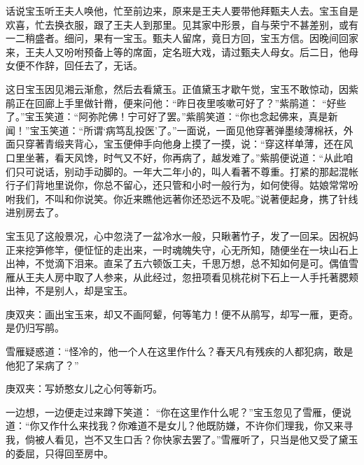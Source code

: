 

\begin{parag}
    话说宝玉听王夫人唤他，忙至前边来，原来是王夫人要带他拜甄夫人去。宝玉自是欢喜，忙去换衣服，跟了王夫人到那里。见其家中形景，自与荣宁不甚差别，或有一二稍盛者。细问，果有一宝玉。甄夫人留席，竟日方回，宝玉方信。因晚间回家来，王夫人又吩咐预备上等的席面，定名班大戏，请过甄夫人母女。后二日，他母女便不作辞，回任去了，无话。
\end{parag}


\begin{parag}
    这日宝玉因见湘云渐愈，然后去看黛玉。正值黛玉才歇午觉，宝玉不敢惊动，因紫鹃正在回廊上手里做针黹，便来问他：“昨日夜里咳嗽可好了？”紫鹃道： “好些了。”宝玉笑道：“阿弥陀佛！宁可好了罢。”紫鹃笑道：“你也念起佛来，真是新闻！”宝玉笑道：“所谓‘病笃乱投医’了。”一面说，一面见他穿著弹墨绫薄棉袄，外面只穿著青缎夹背心，宝玉便伸手向他身上摸了一摸，说：“穿这样单薄，还在风口里坐著，看天风馋，时气又不好，你再病了，越发难了。”紫鹃便说道：“从此咱们只可说话，别动手动脚的。一年大二年小的，叫人看著不尊重。打紧的那起混帐行子们背地里说你，你总不留心，还只管和小时一般行为，如何使得。姑娘常常吩咐我们，不叫和你说笑。你近来瞧他远著你还恐远不及呢。”说著便起身，携了针线进别房去了。
\end{parag}


\begin{parag}
    宝玉见了这般景况，心中忽浇了一盆冷水一般，只瞅著竹子，发了一回呆。因祝妈正来挖笋修竿，便怔怔的走出来，一时魂魄失守，心无所知，随便坐在一块山石上出神，不觉滴下泪来。直呆了五六顿饭工夫，千思万想，总不知如何是可。偶值雪雁从王夫人房中取了人参来，从此经过，忽扭项看见桃花树下石上一人手托著腮颊出神，不是别人，却是宝玉。\begin{note}庚双夹：画出宝玉来，却又不画阿颦，何等笔力！便不从鹃写，却写一雁，更奇。是仍归写鹃。\end{note}雪雁疑惑道：“怪冷的，他一个人在这里作什么？春天凡有残疾的人都犯病，敢是他犯了呆病了？”\begin{note}庚双夹：写娇憨女儿之心何等新巧。\end{note}一边想，一边便走过来蹲下笑道： “你在这里作什么呢？”宝玉忽见了雪雁，便说道：“你又作什么来找我？你难道不是女儿？他既防嫌，不许你们理我，你又来寻我，倘被人看见，岂不又生口舌？你快家去罢了。”雪雁听了，只当是他又受了黛玉的委屈，只得回至房中。
\end{parag}


